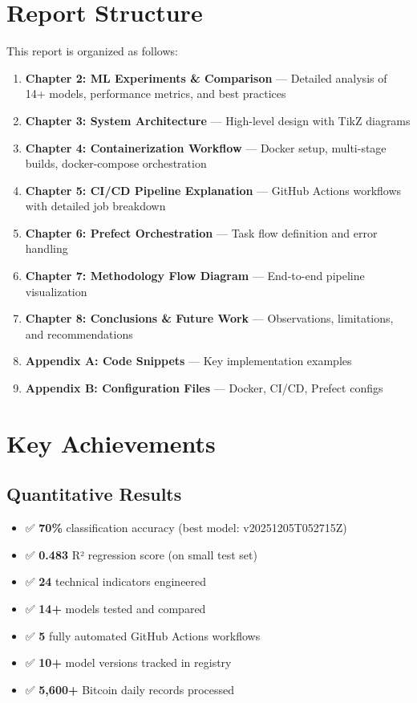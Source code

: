 \section{Report Structure}

This report is organized as follows:

\begin{enumerate}
    \item \textbf{Chapter 2: ML Experiments \& Comparison} — Detailed analysis of 14+ models, performance metrics, and best practices
    \item \textbf{Chapter 3: System Architecture} — High-level design with TikZ diagrams
    \item \textbf{Chapter 4: Containerization Workflow} — Docker setup, multi-stage builds, docker-compose orchestration
    \item \textbf{Chapter 5: CI/CD Pipeline Explanation} — GitHub Actions workflows with detailed job breakdown
    \item \textbf{Chapter 6: Prefect Orchestration} — Task flow definition and error handling
    \item \textbf{Chapter 7: Methodology Flow Diagram} — End-to-end pipeline visualization
    \item \textbf{Chapter 8: Conclusions \& Future Work} — Observations, limitations, and recommendations
    \item \textbf{Appendix A: Code Snippets} — Key implementation examples
    \item \textbf{Appendix B: Configuration Files} — Docker, CI/CD, Prefect configs
\end{enumerate}

\section{Key Achievements}

\subsection{Quantitative Results}
\begin{itemize}
    \item ✅ \textbf{70\%} classification accuracy (best model: v20251205T052715Z)
    \item ✅ \textbf{0.483} R² regression score (on small test set)
    \item ✅ \textbf{24} technical indicators engineered
    \item ✅ \textbf{14+} models tested and compared
    \item ✅ \textbf{5} fully automated GitHub Actions workflows
    \item ✅ \textbf{10+} model versions tracked in registry
    \item ✅ \textbf{5,600+} Bitcoin daily records processed
\end{itemize}

